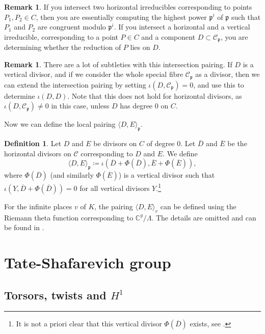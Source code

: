 \documentclass[12pt]{article}
\theoremstyle{definition}
\newtheorem{definition}[theorem]{Definition}
\newtheorem{remark}[theorem]{Remark}
\numberwithin{equation}{subsection}
\newcommand{\C}{\ensuremath{\mathbb{C}}}
\begin{document}
\begin{remark}
If you intersect two horizontal irreducibles corresponding to points $P_1, P_2 \in C$, then you are essentially computing the highest power $\mathfrak{p}^i$ of $\mathfrak{p}$ such that $P_1$ and $P_2$ are congruent modulo $\mathfrak{p}^i$.
If you intersect a horizontal and a vertical irreducible, corresponding to a point $P \in C$ and a component $D \subset \mathcal{C}_\mathfrak{p}$, you are determining whether the reduction of $P$ lies on $D$.
\end{remark}

\begin{remark}
There are a lot of subtleties with this intersection pairing.
If $D$ is a vertical divisor, and if we consider the whole special fibre $\mathcal{C}_\mathfrak{p}$ as a divisor, then we can extend the intersection pairing by setting $\iota(D, \mathcal{C}_\mathfrak{p}) = 0$, and use this to determine $\iota(D,D)$.
Note that this does not hold for horizontal divisors, as $\iota(D, \mathcal{C}_\mathfrak{p}) \neq 0$ in this case, unless $D$ has degree 0 on $C$.
\end{remark}

Now we can define the local pairing $\langle D, E \rangle_\mathfrak{p}$.

\begin{definition}
Let $D$ and $E$ be divisors on $C$ of degree 0.
Let $\overline{D}$ and $\overline{E}$ be the horizontal divisors on $\mathcal{C}$ corresponding to $D$ and $E$.
We define
$$\langle D, E \rangle_\mathfrak{p} \coloneqq \iota\!\left( \overline{D} + \Phi(\overline{D}), \overline{E} + \Phi(\overline{E})\right),$$
where $\Phi(\overline{D})$ (and similarly $\Phi(\overline{E})$) is a vertical divisor such that $\iota(Y, \overline{D} + \Phi(\overline{D})) = 0$ for all vertical divisors $Y$.\footnote{It is not a priori clear that this vertical divisor $\Phi(\overline{D})$ exists, see \cite{Arakelov,heights}.}
\end{definition}

For the infinite places $v$ of $K$, the pairing $\langle D, E\rangle_v$ can be defined using the Riemann theta function corresponding to $\C^g / \Lambda$. The details are omitted and can be found in \cite{Arakelov,heights}.

\section{Tate-Shafarevich group}

\subsection{\texorpdfstring{Torsors, twists and $H^1$}{Torsors, twists and H1}}
\end{document}

